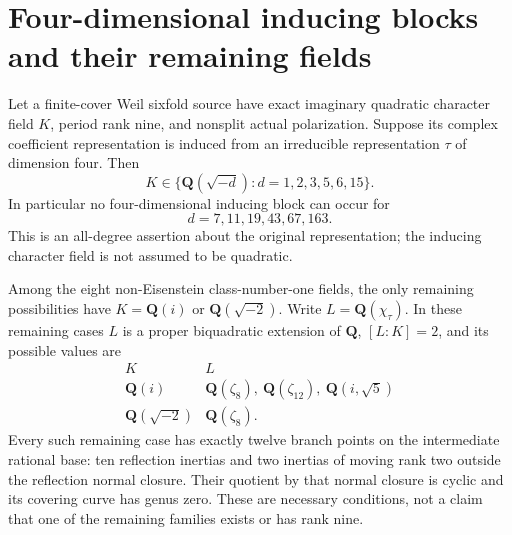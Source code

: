 \section{Four-dimensional inducing blocks and their remaining fields}
\label{sec:rank-four-inducing}

\begin{theorem}
\label{D-BI-11}
Let a finite-cover Weil sixfold source have exact imaginary quadratic
character field $K$, period rank nine, and nonsplit actual polarization.
Suppose its complex coefficient representation is induced from an
irreducible representation $\tau$ of dimension four.  Then
\[
 K\in\{\mathbf Q(\sqrt{-d}):d=1,2,3,5,6,15\}.
                                                               \tag{BI.23}
\]
In particular no four-dimensional inducing block can occur for
\[
                    d=7,11,19,43,67,163.                       \tag{BI.24}
\]
This is an all-degree assertion about the original representation;
the inducing character field is not assumed to be quadratic.

Among the eight non-Eisenstein class-number-one fields, the only
remaining possibilities have $K=\mathbf Q(i)$ or
$\mathbf Q(\sqrt{-2})$.  Write $L=\mathbf Q(\chi_\tau)$.
In these remaining cases $L$ is a proper biquadratic extension of
$\mathbf Q$, $[L:K]=2$, and its possible values are
\[
\begin{array}{c|c}
 K& L\\\hline
 \mathbf Q(i)&\mathbf Q(\zeta_8),\ \mathbf Q(\zeta_{12}),\
                         \mathbf Q(i,\sqrt5)\\
 \mathbf Q(\sqrt{-2})&\mathbf Q(\zeta_8).
\end{array}                                                    \tag{BI.25}
\]
Every such remaining case has exactly twelve branch points on the
intermediate rational base: ten reflection inertias and two inertias
of moving rank two outside the reflection normal closure.
Their quotient by that normal closure is cyclic and its covering
curve has genus zero.  These are necessary conditions, not a claim
that one of the remaining families exists or has rank nine.
\end{theorem}
